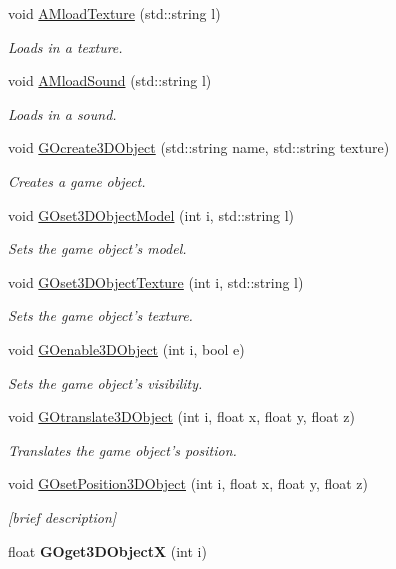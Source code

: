\begin{DoxyCompactItemize}
void \hyperlink{class_i_s_e_aeb016fca4592015d0295b2139e9da7a6}{A\-Mload\-Texture} (std\-::string l)
\begin{DoxyCompactList}\small\item\em Loads in a texture. \end{DoxyCompactList}\item 
void \hyperlink{class_i_s_e_af68e4a9f64f6150cb6373f20e2cf2bb2}{A\-Mload\-Sound} (std\-::string l)
\begin{DoxyCompactList}\small\item\em Loads in a sound. \end{DoxyCompactList}\item 
void \hyperlink{class_i_s_e_ad3948af692b52ff73f48276f06f56fc4}{G\-Ocreate3\-D\-Object} (std\-::string name, std\-::string texture)
\begin{DoxyCompactList}\small\item\em Creates a game object. \end{DoxyCompactList}\item 
void \hyperlink{class_i_s_e_a1b2798117041860b8f63a234d358d7db}{G\-Oset3\-D\-Object\-Model} (int i, std\-::string l)
\begin{DoxyCompactList}\small\item\em Sets the game object's model. \end{DoxyCompactList}\item 
void \hyperlink{class_i_s_e_aaa9f3feea6622822d9399cd840f68081}{G\-Oset3\-D\-Object\-Texture} (int i, std\-::string l)
\begin{DoxyCompactList}\small\item\em Sets the game object's texture. \end{DoxyCompactList}\item 
void \hyperlink{class_i_s_e_a523f49982e18a389e8b8e860c000a4d1}{G\-Oenable3\-D\-Object} (int i, bool e)
\begin{DoxyCompactList}\small\item\em Sets the game object's visibility. \end{DoxyCompactList}\item 
void \hyperlink{class_i_s_e_a3bc1cf01e12a531bc6947a6683d44647}{G\-Otranslate3\-D\-Object} (int i, float x, float y, float z)
\begin{DoxyCompactList}\small\item\em Translates the game object's position. \end{DoxyCompactList}\item 
void \hyperlink{class_i_s_e_afbaa62f4b16e07f19d6c767884fba925}{G\-Oset\-Position3\-D\-Object} (int i, float x, float y, float z)
\begin{DoxyCompactList}\small\item\em \mbox{[}brief description\mbox{]} \end{DoxyCompactList}\item 
\hypertarget{class_i_s_e_a4010efc493c63a24e625eca930991682}{float {\bfseries G\-Oget3\-D\-Object\-X} (int i)}\label{class_i_s_e_a4010efc493c63a24e625eca930991682}


\end{DoxyCompactItemize}
